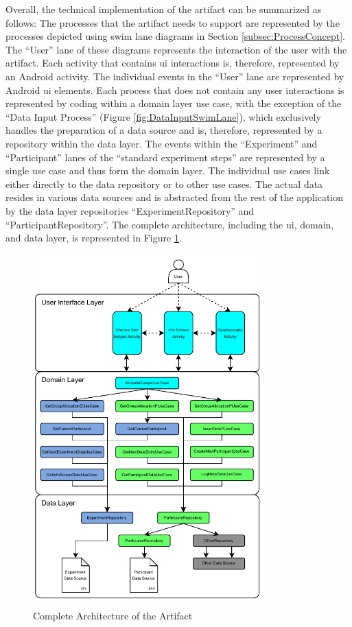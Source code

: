 Overall, the technical implementation of the artifact can be summarized as follows: The processes that the artifact needs to support are represented by the processes depicted using swim lane diagrams in Section \ref{subsec:ProcessConcept}. The \enquote{User} lane of these diagrams represents the interaction of the user with the artifact. Each activity that contains \ac{ui} interactions is, therefore, represented by an Android activity. The individual events in the \enquote{User} lane are represented by Android \ac{ui} elements. Each process that does not contain any user interactions is represented by coding within a domain layer use case, with the exception of the \enquote{Data Input Process} (Figure \ref{fig:DataInputSwimLane}), which exclusively handles the preparation of a data source and is, therefore, represented by a repository within the data layer. The events within the \enquote{Experiment} and \enquote{Participant} lanes of the \enquote{standard experiment steps} are represented by a single use case and thus form the domain layer. The individual use cases link either directly to the data repository or to other use cases. The actual data resides in various data sources and is abstracted from the rest of the application by the data layer repositories \enquote{ExperimentRepository} and \enquote{ParticipantRepository}. The complete architecture, including the \ac{ui}, domain, and data layer, is represented in Figure \ref{fig:completeArchitecture}.


\begin{figure}[htbp]
    \centering
    \includegraphics[width=0.79\textwidth, keepaspectratio]{content/05_design_and_dev_artefacts/Complete Architecture.drawio.pdf}
    \caption{Complete Architecture of the Artifact}    
    \label{fig:completeArchitecture}
\end{figure}